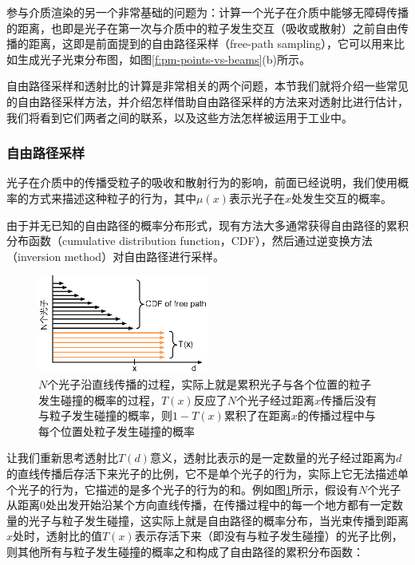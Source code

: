 参与介质渲染的另一个非常基础的问题为：计算一个光子在介质中能够无障碍传播的距离，也即是光子在第一次与介质中的粒子发生交互（吸收或散射）之前自由传播的距离，这即是前面提到的自由路径采样（free-path sampling），它可以用来比如生成光子光束分布图，如图\ref{f:pm-points-vs-beams}(b)所示。

自由路径采样和透射比的计算是非常相关的两个问题，本节我们就将介绍一些常见的自由路径采样方法，并介绍怎样借助自由路径采样的方法来对透射比进行估计，我们将看到它们两者之间的联系，以及这些方法怎样被运用于工业中。




\subsubsection{自由路径采样}
光子在介质中的传播受粒子的吸收和散射行为的影响，前面已经说明，我们使用概率的方式来描述这种粒子的行为，其中$\mu(x)$表示光子在$x$处发生交互的概率。

由于并无已知的自由路径的概率分布形式，现有方法大多通常获得自由路径的累积分布函数（cumulative distribution function，CDF），然后通过逆变换方法（inversion method）对自由路径进行采样。

\begin{figure}
	\sidecaption
	\includegraphics[width=0.5\textwidth]{figures/pm/free-path-cdf}
	\caption{$N$个光子沿直线传播的过程，实际上就是累积光子与各个位置的粒子发生碰撞的概率的过程，$T(x)$反应了$N$个光子经过距离$x$传播后没有与粒子发生碰撞的概率，则$1-T(x)$累积了在距离$x$的传播过程中与每个位置处粒子发生碰撞的概率}
	\label{f:pm-free-path-cdf}
\end{figure}

让我们重新思考透射比$T(d)$意义，透射比表示的是一定数量的光子经过距离为$d$的直线传播后存活下来光子的比例，它不是单个光子的行为，实际上它无法描述单个光子的行为，它描述的是多个光子的行为的和。例如图\ref{f:pm-free-path-cdf}所示，假设有$N$个光子从距离0处出发开始沿某个方向直线传播，在传播过程中的每一个地方都有一定数量的光子与粒子发生碰撞，这实际上就是自由路径的概率分布，当光束传播到距离$x$处时，透射比的值$T(x)$表示存活下来（即没有与粒子发生碰撞）的光子比例，则其他所有与粒子发生碰撞的概率之和构成了自由路径的累积分布函数：

